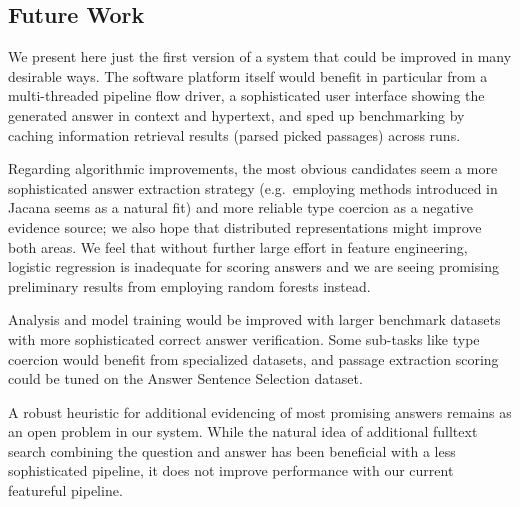 \documentclass{poster15}
\begin{document}
\subsection{Future Work}

We present here just the first version of a system that could be improved in
many desirable ways.  The software platform itself would benefit in particular
from a multi-threaded pipeline flow driver, a sophisticated user interface showing
the generated answer in context and hypertext, and sped up benchmarking
by caching information retrieval results (parsed picked passages) across runs.

Regarding algorithmic improvements, the most obvious candidates seem
a more sophisticated answer extraction strategy
(e.g.\ employing methods introduced in Jacana seems as a natural fit)
and more reliable type coercion as a negative evidence source;
we also hope that distributed representations might improve both areas.
We feel that without further large effort in feature engineering, logistic
regression is inadequate for scoring answers and we are seeing promising
preliminary results from employing random forests instead.

Analysis and model training would be improved with larger benchmark datasets
with more sophisticated correct answer verification.  Some sub-tasks
like type coercion would benefit from specialized datasets,
and passage extraction scoring could be tuned on the Answer Sentence Selection
dataset.

A robust heuristic for additional evidencing of most promising answers
remains as an open problem in our system.
While the natural idea of additional fulltext search combining the question and answer
has been beneficial with a less sophisticated pipeline, it does not improve performance
with our current featureful pipeline.


%
%
%
%
\end{document}
